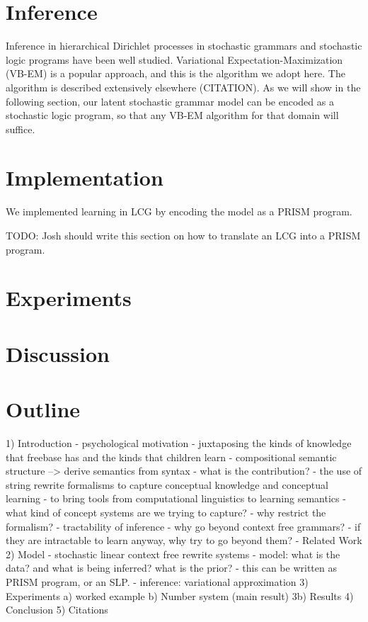 \documentclass{article}
\begin{document}
\section{Inference}
Inference in hierarchical Dirichlet processes in stochastic grammars
and stochastic logic programs have been well studied. Variational
Expectation-Maximization (VB-EM) is a popular approach, and this is
the algorithm we adopt here. The algorithm is described extensively
elsewhere (CITATION). As we will show in the following section, our
latent stochastic grammar model can be encoded as a stochastic logic
program, so that any VB-EM algorithm for that domain will suffice. 

\section{Implementation}
We implemented learning in LCG by encoding the model as a PRISM program.

TODO: Josh should write this section on how to translate an LCG into a
PRISM program.

\section{Experiments}
\section{Discussion}

\section{Outline}
1) Introduction
  - psychological motivation 
    - juxtaposing the kinds of knowledge that freebase has and the kinds that children learn
    - compositional semantic structure --> derive semantics from syntax
  - what is the contribution?
     - the use of string rewrite formalisms to capture conceptual knowledge and conceptual learning
     - to bring tools from computational linguistics to learning semantics
  - what kind of concept systems are we trying to capture?
  - why restrict the formalism? 
     - tractability of inference 
  - why go beyond context free grammars? 
     - if they are intractable to learn anyway, why try to go beyond them? 
  - Related Work
2) Model
- stochastic linear context free rewrite systems
  - model: what is the data? and what is being inferred? what is the prior? 
  - this can be written as PRISM program, or an SLP. 
  - inference: variational approximation 
3) Experiments
  a) worked example
  b) Number system (main result)
  3b) Results
4) Conclusion
5) Citations
\end{document}
